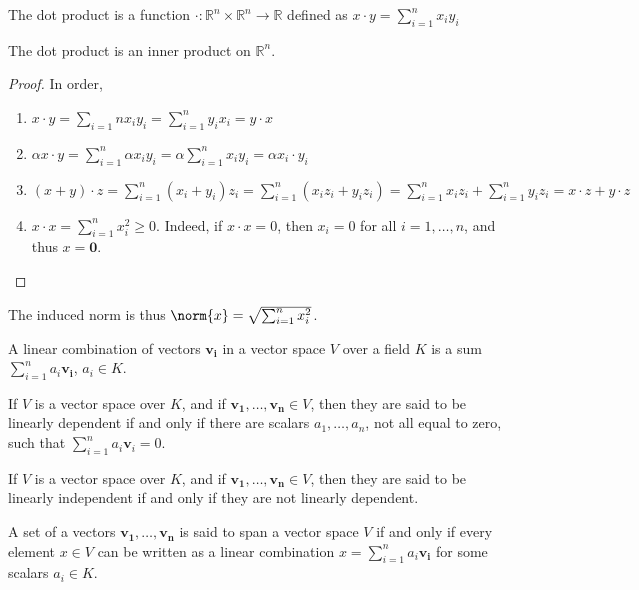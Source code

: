             \begin{definition}
            The dot product is a function $\cdot:\mathbb{R}^n \times \mathbb{R}^n \rightarrow \mathbb{R}$ defined as $x\cdot y = \sum_{i=1}^{n} x_iy_i$
            \end{definition}
            \begin{theorem}
            The dot product is an inner product on $\mathbb{R}^n$.
            \end{theorem}
            \begin{proof}
            In order,
            \begin{enumerate}
            \item $x\cdot y = \sum_{i=1}{n} x_i y_i = \sum_{i=1}^{n} y_i x_i = y\cdot x$
            \item $\alpha x\cdot y = \sum_{i=1}^{n} \alpha x_i y_i = \alpha \sum_{i=1}^{n} x_i y_i = \alpha x_i \cdot y_i$
            \item $(x+y)\cdot z = \sum_{i=1}^{n} (x_i+y_i)z_i = \sum_{i=1}^{n} (x_iz_i +y_i z_i)=\sum_{i=1}^{n}x_i z_i+\sum_{i=1}^{n} y_i z_i = x\cdot z + y\cdot z$
            \item $x\cdot x = \sum_{i=1}^{n} x_i^2 \geq 0$. Indeed, if $x\cdot x = 0$, then $x_i = 0$ for all $i=1,\hdots, n$, and thus $x=\mathbf{0}$.
            \end{enumerate}
            \end{proof}
            The induced norm is thus $\norm{x} = \sqrt{\sum_{i=1}^{n} x_i^2}$.
            \begin{definition}
            A linear combination of vectors $\mathbf{v_i}$ in a vector space $V$ over a field $K$ is a sum $\sum_{i=1}^{n} a_i \mathbf{v_i}$, $a_i \in K$.
            \end{definition}
            \begin{definition}
            If $V$ is a vector space over $K$, and if $\mathbf{v_1},\hdots, \mathbf{v_n}\in V$, then they are said to be linearly dependent if and only if there are scalars $a_1,\hdots, a_n$, not all equal to zero, such that $\sum_{i=1}^{n} a_i \mathbf{v}_i = 0$.
            \end{definition}
            \begin{definition}
            If $V$ is a vector space over $K$, and if $\mathbf{v_1},\hdots, \mathbf{v_n}\in V$, then they are said to be linearly independent if and only if they are not linearly dependent.
            \end{definition}
            \begin{definition}
            A set of a vectors $\mathbf{v_1},\hdots, \mathbf{v_n}$ is said to span a vector space $V$ if and only if every element $x\in V$ can be written as a linear combination $x=\sum_{i=1}^{n} a_i \mathbf{v_i}$ for some scalars $a_i \in K$.
            \end{definition}
